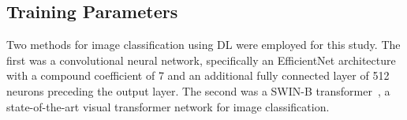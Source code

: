\begin{table}[h]
	\centering
	\caption{Number of images per diagnosis in each dataset.}
	\label{tab:generalisation_datasets}
\end{table}

\subsection{Training Parameters}
\label{subsec:generalisation_training}
Two methods for image classification using DL were employed for this study. The first was a convolutional neural network, specifically an EfficientNet architecture~\citep{tan2019efficient} with a compound coefficient of 7 and an additional fully connected layer of 512 neurons preceding the output layer. The second was a SWIN-B transformer~\citep{liu2021swin}, a state-of-the-art visual transformer network for image classification. 

